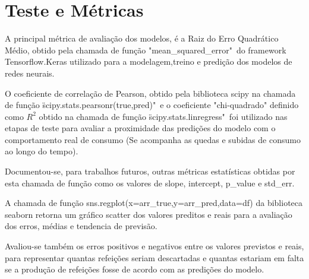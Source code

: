     \section{Teste e Métricas}
       A principal métrica de avaliação dos modelos, é a Raiz do Erro Quadrático Médio, obtido pela chamada de função "mean\_squared\_error"\ do framework Tensorflow.Keras utilizado para a modelagem,treino e predição dos modelos de redes neurais.
       
        O coeficiente de correlação de Pearson, obtido pela biblioteca scipy na chamada de função \"scipy.stats.pearsonr(true,pred)"\ e o coeficiente "chi-quadrado" definido como $R^2$ obtido na chamada de função \"scipy.stats.linregress"\ foi utilizado nas etapas de teste para avaliar a proximidade das predições do modelo com o comportamento real de consumo (Se acompanha as quedas e subidas de consumo ao longo do tempo).\newline
       
        Documentou-se, para trabalhos futuros, outras métricas estatísticas obtidas por esta chamada de função como os valores de slope, intercept, p\_value e std\_err.\newline
       
        A chamada de função sns.regplot(x=arr\_true,y=arr\_pred,data=df) da biblioteca seaborn  retorna um gráfico scatter dos valores preditos e reais para a avaliação dos erros, médias e tendencia de previsão.\newline 
       
       Avaliou-se também os erros positivos e negativos entre os valores previstos e reais, para representar quantas refeições seriam descartadas e quantas estariam em falta se a produção de refeições fosse de acordo com as predições do modelo.
       
